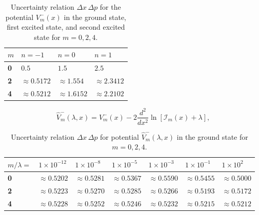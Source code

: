 \documentclass[12pt]{article}
\begin{document}
\begin{table}[htp]
\centering
\setlength{\tabcolsep}{1em} %
\begin{tabularx}{\columnwidth}{@{}>{\bfseries}l *{3}{X}@{}}

\toprule
$m$ & $n=-1$ & $n=0$ & $n=1$ \\
\toprule
0 & $0.5$            & $1.5$     & $2.5$    \\
2 & $\approx 0.5172$ & $\approx 1.554$  & $\approx 2.3412$ \\
4 & $\approx 0.5212$ & $\approx 1.6152$ & $\approx 2.2102$ \\
\bottomrule

\end{tabularx}
\caption{Uncertainty relation $\Delta x \, \Delta p$ for the potential $V^-_m(x)$ in the ground state, first excited state, and second excited state for $m=0,2,4$.}
\label{tab-un-re}
\end{table}






\begin{equation}
\hat{V}^-_m(\lambda,x)=V^-_m(x)-2 \frac{d^2}{dx^2}\ln\left[\mathcal{I}_m(x)+\lambda\right],\label{ISO-V}
\end{equation}

\begin{table}[htp]
\centering
\setlength{\tabcolsep}{1em} %
\begin{tabularx}{\columnwidth}{@{}>{\bfseries}l *{6}{X}@{}}
\toprule
$m/\lambda =$ & $1\times 10^{-12}$ & $1\times 10^{-8}$ & $1\times 10^{-5}$ & $1\times 10^{-3}$ & $1\times 10^{-1}$ & $1\times 10^{2}$ \\
\toprule
0 & $\approx 0.5202$ & $\approx 0.5281$ & $\approx 0.5367$ & $\approx 0.5590$ & $\approx 0.5455$ & $\approx 0.5000$ \\
2 & $\approx 0.5223$ & $\approx 0.5270$ & $\approx 0.5285$ & $\approx 0.5266$ & $\approx 0.5193$ & $\approx 0.5172$ \\
4 & $\approx 0.5228$ & $\approx 0.5252$ & $\approx 0.5246$ & $\approx 0.5232$ & $\approx 0.5215$ & $\approx 0.5212$ \\
\bottomrule
\end{tabularx}
\caption{Uncertainty relation $\Delta x \, \Delta p$ for potential $\hat{V}^-_m(\lambda,x)$ in the ground state for $m = 0,2,4$.}
\label{tab-un-iso}
\end{table}


\newpage
\end{document}
